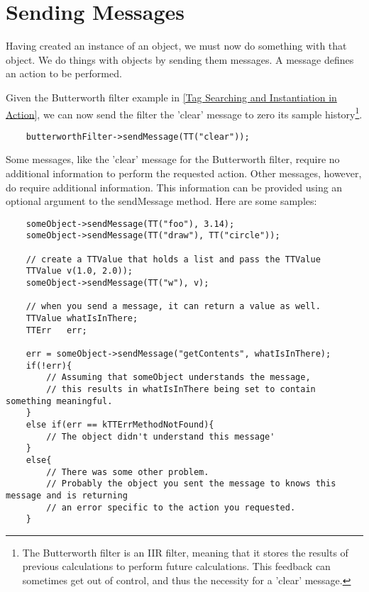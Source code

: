 

\section{Sending Messages}

Having created an instance of an object, we must now do something with that object.
We do things with objects by sending them messages. 
A message defines an action to be performed. 

Given the Butterworth filter example in \ref{Tag Searching and Instantiation in Action}, we can now send the filter the 'clear' message to zero its sample history\footnote{The Butterworth filter is an IIR filter, meaning that it stores the results of previous calculations to perform future calculations.  This feedback can sometimes get out of control, and thus the necessity for a 'clear' message.}.

\begin{lstlisting}
	butterworthFilter->sendMessage(TT("clear"));
\end{lstlisting}

Some messages, like the 'clear' message for the Butterworth filter, require no additional information to perform the requested action.
Other messages, however, do require additional information.  
This information can be provided using an optional argument to the sendMessage method.  Here are some samples:

\begin{lstlisting}
	someObject->sendMessage(TT("foo"), 3.14);
	someObject->sendMessage(TT("draw"), TT("circle"));

	// create a TTValue that holds a list and pass the TTValue
	TTValue v(1.0, 2.0));
	someObject->sendMessage(TT("w"), v);
	
	// when you send a message, it can return a value as well.
	TTValue whatIsInThere;
	TTErr   err;
	
	err = someObject->sendMessage("getContents", whatIsInThere);
	if(!err){
		// Assuming that someObject understands the message, 
		// this results in whatIsInThere being set to contain something meaningful.	
	}
	else if(err == kTTErrMethodNotFound){
		// The object didn't understand this message'
	}
	else{
		// There was some other problem.
		// Probably the object you sent the message to knows this message and is returning 
		// an error specific to the action you requested.
	}
\end{lstlisting}



